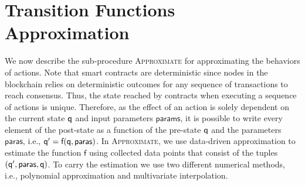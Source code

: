 %



\section{Transition Functions Approximation} \label{sec:approximate}
We now describe the sub-procedure \textsc{Approximate} for approximating the behaviors of actions. 
Note that smart contracts are deterministic since nodes in the blockchain relies on deterministic outcomes for any sequence of transactions to reach consensus. Thus, the state reached by contracts when executing a sequence of actions is unique. Therefore, as the effect of an action is solely dependent on the current state $\mathsf{q}$ and input parameters $\textsf{params}$, it is possible to write every element of the post-state as a function of the pre-state $\mathsf{q}$ and the parameters $\textsf{paras}$, i.e., $\mathsf{q}' = \textsf{f}(\mathsf{q}, \textsf{paras})$. In \textsc{Approximate}, we use data-driven approximation to estimate the function $\textsf{f}$ using collected data points that consist of the tuples $(\mathsf{q}',\textsf{paras},\mathsf{q})$. To carry the estimation we use two different numerical methods, i.e., polynomial approximation and multivariate interpolation. 

